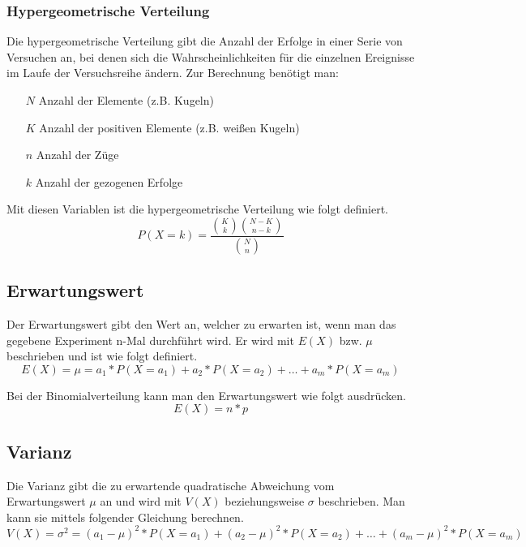 \documentclass[a4paper]{article}
\begin{document}
			\subsubsection{Hypergeometrische Verteilung}
				Die hypergeometrische Verteilung gibt die Anzahl der Erfolge in einer Serie von Versuchen an, bei denen sich die Wahrscheinlichkeiten für die einzelnen Ereignisse im Laufe der Versuchsreihe ändern. Zur Berechnung benötigt man:
				\begin{itemize}
					\item[$N$] Anzahl der Elemente (z.B. Kugeln)
					\item[$K$] Anzahl der positiven Elemente (z.B. weißen Kugeln)
					\item[$n$] Anzahl der Züge
					\item[$k$] Anzahl der gezogenen Erfolge
				\end{itemize}
				
				\noindent
				Mit diesen Variablen ist die hypergeometrische Verteilung wie folgt definiert.
				\begin{equation}
					P\left(X = k\right) = \frac{
						\binom{K}{k}
						\binom{N-K}{n-k}
					}{
						\binom{N}{n}
					}
				\end{equation}
			
		\subsection{Erwartungswert}
			Der Erwartungswert gibt den Wert an, welcher zu erwarten ist, wenn man das gegebene Experiment n-Mal durchführt wird. Er wird mit $E\left(X\right)$ bzw. $\mu$ beschrieben und ist wie folgt definiert.
			\begin{equation}
				E(X) = \mu = a_1 * P(X = a_1) + a_2 * P(X = a_2) + \dotsc + a_m * P(X = a_m)
			\end{equation}
			
			\noindent
			Bei der Binomialverteilung kann man den Erwartungswert wie folgt ausdrücken.
			\begin{equation}
				E(X) = n * p
			\end{equation}
		\subsection{Varianz}
			Die Varianz gibt die zu erwartende quadratische Abweichung vom Erwartungswert $\mu$ an und wird mit $V\left(X\right)$ beziehungsweise $\sigma$ beschrieben. Man kann sie mittels folgender Gleichung berechnen.
			\begin{equation}
				V(X) = \sigma^2 = (a_1 - \mu)^2 * P(X = a_1) + (a_2 - \mu)^2 * P(X = a_2) + \dotsc + (a_m - \mu)^2 * P(X = a_m)
			\end{equation}
			
\end{document}
